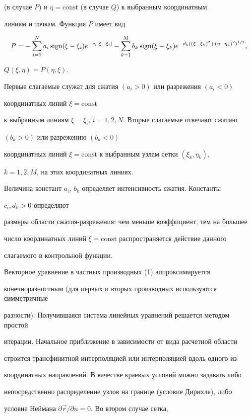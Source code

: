 (в случае $P$) и $\eta=\text{const}$ (в случае $Q$) к выбранным координатным 


линиям и точкам. Функция $P$ имеет вид 


$$ 


P=-\sum^N_{i=1}a_i\sign(\xi-\xi_i)e^{-c_i|\xi-\xi_i|} 


-\sum^M_{k=1}b_k\sign(\xi-\xi_k)e^{-d_k((\xi-\xi_k)^2+(\eta-\eta_k)^2)^{1/2}}, 


$$ 


$Q(\xi,\eta)=P(\eta,\xi)$. 


Первые слагаемые служат для сжатия $(a_i>0)$ или разрежения $(a_i<0)$ 


координатных линий $\xi=\text{const}$ 


к выбранным линиям $\xi=\xi_i$, $i=1,2,N$. Вторые слагаемые отвечают сжатию 


$(b_k>0)$ или разрежению $(b_k<0)$ 


координатных линий $\xi=\text{const}$ к выбранным узлам сетки $(\xi_k,\eta_k)$, 


$k=1,2,M$, на этих координатных линиях. 


Величина констант $a_i$, $b_k$ определяет интенсивность сжатия. Константы 


$c_i,d_k>0$ определяют 


размеры области сжатия-разрежения: чем меньше коэффициент, тем на большее 


число координатных линий $\xi=\text{const}$ распространяется действие данного 


слагаемого в контрольной функции. 


 


Векторное уравнение в частных производных (1) аппроксимируется 


конечноразностным (для первых и вторых производных используются симметричные 


разности). Получившаяся система линейных уравнений решается методом простой 


итерации. Начальное приближение в зависимости от вида расчетной области 


строится трансфинитной интерполяцией или интерполяцией вдоль одного из 


координатных направлений. В качестве краевых условий можно задавать либо 


непосредственно распределение узлов на границе (условие Дирихле), либо 


условие Ней\-мана $\partial\Vec r/\partial n=0$. Во втором случае сетка, 


